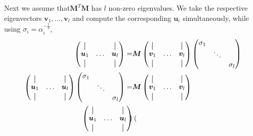 Next we assume that$\bm{M}^T \bm{M}$ has $l$  non-zero eigenvalues.
We take the respective eigenvectors $\bm{v}_1, \hdots, \bm{v}_l$  and compute the corresponding $\bm{u}_i$ 
simultaneously, while using $\sigma_i=\alpha_i^{-\frac{1}{2}}$,
\begin{align}
    \begin{pmatrix}
    \vertbar &        & \vertbar \\
    \bm{u}_1 & \hdots & \bm{u}_l \\
    \vertbar &        & \vertbar 
    \end{pmatrix} =&
    \bm{M}
    \begin{pmatrix}
    \vertbar &        & \vertbar \\
    \bm{v}_1 & \hdots & \bm{v}_l \\
    \vertbar &        & \vertbar 
    \end{pmatrix}
    \begin{pmatrix}
    \sigma_1 &        &          \\
                & \ddots &          \\ 
                &        & \sigma_l
    \end{pmatrix} \\
    \begin{pmatrix}
    \vertbar &        & \vertbar \\
    \bm{u}_1 & \hdots & \bm{u}_l \\
    \vertbar &        & \vertbar 
    \end{pmatrix}
    \begin{pmatrix}
        \sigma_1 &        &          \\
                    & \ddots &          \\ 
                    &        & \sigma_l
        \end{pmatrix}
    =&
    \bm{M}
    \begin{pmatrix}
    \vertbar &        & \vertbar \\
    \bm{v}_1 & \hdots & \bm{v}_l \\
    \vertbar &        & \vertbar 
    \end{pmatrix} \\
    \begin{pmatrix}
    \vertbar &        & \vertbar \\
    \bm{u}_1 & \hdots & \bm{u}_l \\
    \vertbar &        & \vertbar 
    \end{pmatrix}
    \begin{pmatrix}

\end{pmatrix}
\end{align}
